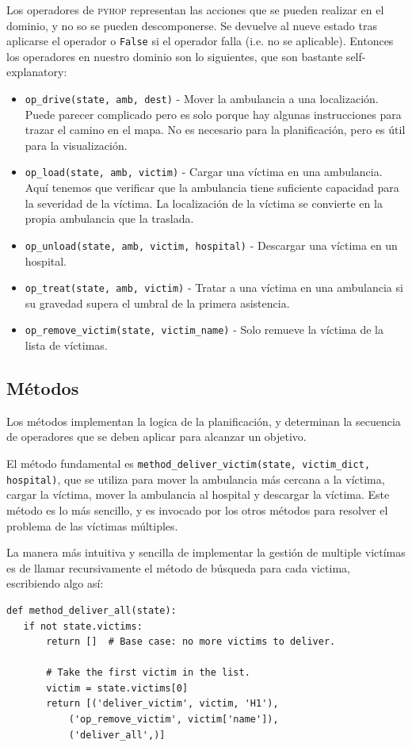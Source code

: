 Los operadores de \textsc{pyhop} representan las acciones que se pueden realizar en el dominio, y no so se pueden descomponerse. Se devuelve al nueve estado tras aplicarse el operador o \lstinline|False| si el operador falla (i.e. no se aplicable).
Entonces los operadores en nuestro dominio son lo siguientes, que son bastante self-explanatory:
\begin{itemize}
   \item \lstinline|op_drive(state, amb, dest)| - Mover la ambulancia a una localización. Puede parecer complicado pero es solo porque hay algunas instrucciones para trazar el camino en el mapa. No es necesario para la planificación, pero es útil para la visualización. 
   \item \lstinline|op_load(state, amb, victim)| - Cargar una víctima en una ambulancia. Aquí tenemos que verificar que la ambulancia tiene suficiente capacidad para la severidad de la víctima.
   La localización de la víctima se convierte en la propia ambulancia que la traslada.
   \item \lstinline|op_unload(state, amb, victim, hospital)| - Descargar una víctima en un hospital.
   \item \lstinline|op_treat(state, amb, victim)| - Tratar a una víctima en una ambulancia si su gravedad supera el umbral de la primera asistencia.
   \item \lstinline|op_remove_victim(state, victim_name)| - Solo remueve la víctima de la lista de víctimas.
\end{itemize}

\subsection{Métodos}

Los métodos implementan la logica de la planificación, y determinan la secuencia de operadores que se deben aplicar para alcanzar un objetivo.

El método fundamental es \lstinline|method_deliver_victim(state, victim_dict, hospital)|, que se utiliza para mover la ambulancia más cercana a la víctima, cargar la víctima, mover la ambulancia al hospital y descargar la víctima.
Este método es lo más sencillo, y es invocado por los otros métodos para resolver el problema de las víctimas múltiples.


La manera más intuitiva y sencilla de implementar la gestión de multiple victímas es de llamar recursivamente el método de búsqueda para cada victima, escribiendo algo así:
\begin{lstlisting}[caption={Esto no se encuentra en el codigo entregado}, captionpos=b]
   def method_deliver_all(state):
   if not state.victims:
       return []  # Base case: no more victims to deliver.
   
       # Take the first victim in the list.
       victim = state.victims[0]
       return [('deliver_victim', victim, 'H1'),
           ('op_remove_victim', victim['name']),
           ('deliver_all',)]
\end{lstlisting}

